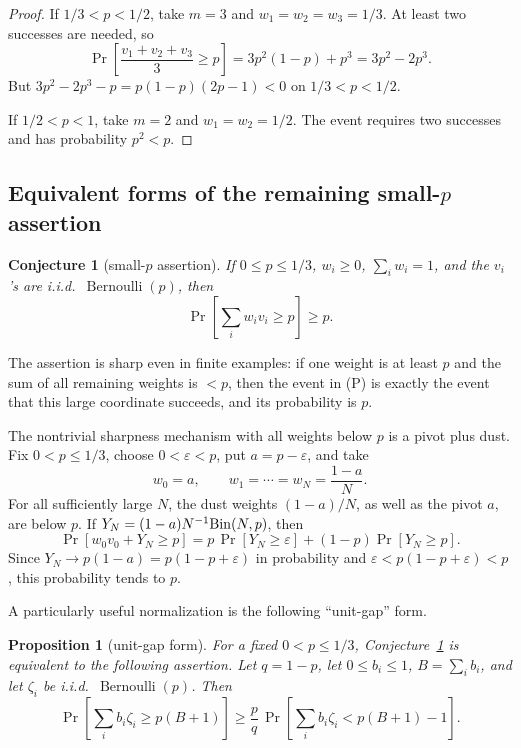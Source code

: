 \documentclass[12pt]{article}
\newtheorem{proposition}{Proposition}
\newtheorem{conjecture}{Conjecture}
\newcommand{\Ber}{\operatorname{Bernoulli}}
\begin{document}
\begin{proof}
If \(1/3<p<1/2\), take \(m=3\) and \(w_1=w_2=w_3=1/3\).  At least two
successes are needed, so
\[
\Pr\!\left[\frac{v_1+v_2+v_3}{3}\ge p\right]
  =3p^2(1-p)+p^3
  =3p^2-2p^3 .
\]
But \(3p^2-2p^3-p=p(1-p)(2p-1)<0\) on \(1/3<p<1/2\).

If \(1/2<p<1\), take \(m=2\) and \(w_1=w_2=1/2\).  The event requires two
successes and has probability \(p^2<p\).
\end{proof}

\subsection*{Equivalent forms of the remaining small-\(p\) assertion}

\begin{conjecture}[small-\(p\) assertion]\label{conj:missing}
If \(0\le p\le1/3\), \(w_i\ge0\), \(\sum_iw_i=1\), and the \(v_i\)'s are
i.i.d.\ \(\Ber(p)\), then
\[
   \Pr\!\left[\sum_i w_i v_i\ge p\right]\ge p .
\]
\end{conjecture}

The assertion is sharp even in finite examples: if one weight is at least \(p\) and
the sum of all remaining weights is \(<p\), then the event in (P) is exactly
the event that this large coordinate succeeds, and its probability is \(p\).

The nontrivial sharpness mechanism with all weights below \(p\) is a pivot plus
dust.  Fix \(0<p\le1/3\), choose \(0<\varepsilon<p\), put
\(a=p-\varepsilon\), and take
\[
   w_0=a,\qquad
   w_1=\cdots=w_N=\frac{1-a}{N}.
\]
For all sufficiently large \(N\), the dust weights \((1-a)/N\), as well as the
pivot \(a\), are below \(p\).
If \(Y_N=(1-a)N^{-1}{\rm Bin}(N,p)\), then
\[
 \Pr\!\left[w_0v_0+Y_N\ge p\right]
 =
 p\,\Pr[Y_N\ge\varepsilon]+(1-p)\Pr[Y_N\ge p].
\]
Since \(Y_N\to p(1-a)=p(1-p+\varepsilon)\) in probability and
\(\varepsilon<p(1-p+\varepsilon)<p\), this probability tends to \(p\).

A particularly useful normalization is the following ``unit-gap'' form.

\begin{proposition}[unit-gap form]\label{prop:unitgap}
For a fixed \(0<p\le1/3\), Conjecture~\ref{conj:missing} is equivalent to the
following assertion.  Let \(q=1-p\), let \(0\le b_i\le1\),
\(B=\sum_i b_i\), and let \(\zeta_i\) be i.i.d.\ \(\Ber(p)\).  Then
\[
 \Pr\!\left[\sum_i b_i\zeta_i\ge p(B+1)\right]
 \ge
 \frac{p}{q}\,
 \Pr\!\left[\sum_i b_i\zeta_i<p(B+1)-1\right].            \tag{UG}
\]
\end{proposition}
\end{document}
